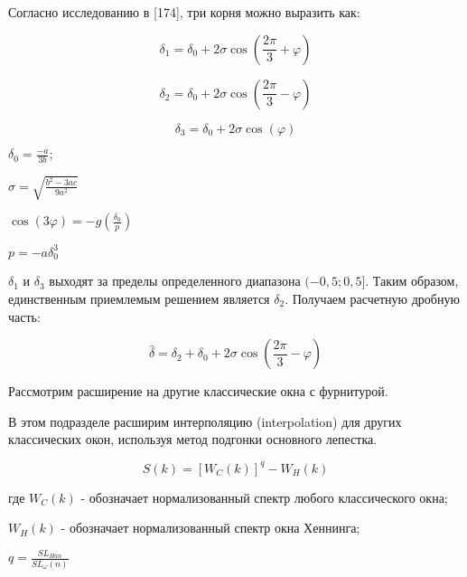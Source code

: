 Согласно исследованию в [174], три корня можно выразить как:


\begin{equation}
\label{eq:equation56}
\delta_1 = 
\delta_0 + 2 \sigma \cos \left({\frac{2 \pi}{3}} + \varphi  \right) 
\end{equation}

\begin{equation}
\label{eq:equation57}
\delta_2 = 
\delta_0 + 2 \sigma \cos \left({\frac{2 \pi}{3}} - \varphi  \right) 
\end{equation}

\begin{equation}
\label{eq:equation58}
\delta_3 = 
\delta_0 + 2 \sigma \cos (\varphi) 
\end{equation}

$\delta_0 = \frac{-a}{3b};$

$\sigma = \sqrt{\frac{b^2 - 3ac}{9a^2}}$

$\cos(3 \varphi) = - g \left( {\frac{\delta_0}{p}}
\right) $

$p = -a \delta_0 ^3$

$\delta_1$ и $\delta_3$ выходят за пределы определенного диапазона $(-0,5;0,5]$. Таким образом, единственным приемлемым решением является $\delta_2 $. Получаем расчетную дробную часть:

\begin{equation}
\label{eq:equation59}
\hat{\delta} = \delta_2 + \delta_0 + 2 \sigma \cos \left({\frac{2 \pi}{3} - \varphi} \right) 
\end{equation}

Рассмотрим расширение на другие классические окна с фурнитурой.

В этом подразделе расширим интерполяцию (interpolation) для других классических окон, используя метод подгонки основного лепестка. 

\begin{equation}
\label{eq:equation60}
S(k) = [W_C (k)]^q - W_H (k)
\end{equation}

где $W_C (k)$ - обозначает нормализованный спектр любого классического окна;

$W_H (k)$ - обозначает нормализованный спектр окна Хеннинга;

$q = \frac{S L_{Han}}{S L_\omega(n)}$

